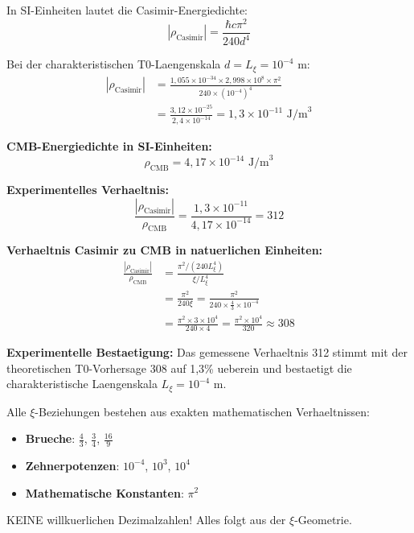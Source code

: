 \documentclass[12pt,a4paper]{article}
\begin{document}
	In SI-Einheiten lautet die Casimir-Energiedichte:
	\begin{equation}
		|\rho_{\text{Casimir}}| = \frac{\hbar c \pi^2}{240 d^4}
	\end{equation}
	
	Bei der charakteristischen T0-Laengenskala $d = L_\xi = 10^{-4}$ m:
	\begin{align}
		|\rho_{\text{Casimir}}| &= \frac{1{,}055 \times 10^{-34} \times 2{,}998 \times 10^8 \times \pi^2}{240 \times (10^{-4})^4} \\
		&= \frac{3{,}12 \times 10^{-25}}{2{,}4 \times 10^{-14}} = 1{,}3 \times 10^{-11} \text{ J/m}^3
	\end{align}
	
	\textbf{CMB-Energiedichte in SI-Einheiten:}
	\begin{equation}
		\rho_{\text{CMB}} = 4{,}17 \times 10^{-14} \text{ J/m}^3
	\end{equation}
	
	\textbf{Experimentelles Verhaeltnis:}
	\begin{equation}
		\frac{|\rho_{\text{Casimir}}|}{\rho_{\text{CMB}}} = \frac{1{,}3 \times 10^{-11}}{4{,}17 \times 10^{-14}} = 312
	\end{equation}
	
	\textbf{Verhaeltnis Casimir zu CMB in natuerlichen Einheiten:}
	\begin{align}
		\frac{|\rho_{\text{Casimir}}|}{\rho_{\text{CMB}}} &= \frac{\pi^2 / (240 L_\xi^4)}{\xi / L_\xi^4} \\
		&= \frac{\pi^2}{240 \xi} = \frac{\pi^2}{240 \times \frac{4}{3} \times 10^{-4}} \\
		&= \frac{\pi^2 \times 3 \times 10^4}{240 \times 4} = \frac{\pi^2 \times 10^4}{320} \approx 308
	\end{align}
	
	\textbf{Experimentelle Bestaetigung:} Das gemessene Verhaeltnis 312 stimmt mit der theoretischen T0-Vorhersage 308 auf 1{,}3\% ueberein und bestaetigt die charakteristische Laengenskala $L_\xi = 10^{-4}$ m.
	
	\begin{important}
		Alle $\xi$-Beziehungen bestehen aus exakten mathematischen Verhaeltnissen:
		\begin{itemize}
			\item \textbf{Brueche}: $\frac{4}{3}$, $\frac{3}{4}$, $\frac{16}{9}$
			\item \textbf{Zehnerpotenzen}: $10^{-4}$, $10^3$, $10^4$
			\item \textbf{Mathematische Konstanten}: $\pi^2$
		\end{itemize}
		KEINE willkuerlichen Dezimalzahlen! Alles folgt aus der $\xi$-Geometrie.
	\end{important}
	
\end{document}
